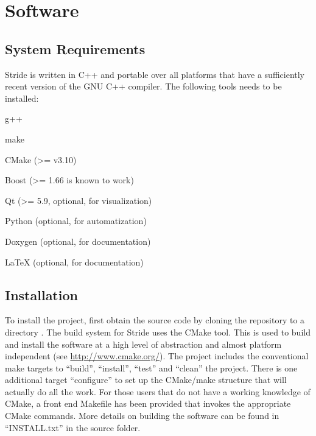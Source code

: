 \chapter{Software}
\label{chap:software}


\section{System Requirements}
\label{section:system}

Stride is written in C++ and portable over all platforms that have a sufficiently recent version of the GNU C++ compiler. 
The following tools needs to be installed:
\begin{compactitem}
    \item g++
    \item make
    \item CMake (\textgreater = v3.10)
    \item Boost (\textgreater = 1.66 is known to work)
    \item Qt (\textgreater = 5.9, optional, for visualization)
    \item Python (optional, for automatization)
    \item Doxygen (optional, for documentation)
    \item LaTeX (optional, for documentation)
\end{compactitem}


\section{Installation}
\label{section:Installation}

To install the project, first obtain the source code by cloning the repository to a directory .
The build system for Stride uses the CMake tool. This is used to build and install the software at a high level of abstraction and almost platform independent (see \url{http://www.cmake.org/}). 
The project includes the conventional make targets to ``build'', ``install'', ``test'' and ``clean'' the project. There is one additional target ``configure'' to set up the CMake/make structure that will actually do all the work.
For those users that do not have a working knowledge of CMake, a front end Makefile has been provided that invokes the appropriate CMake commands.
More details on building the software can be found in ``INSTALL.txt'' in the source folder.


